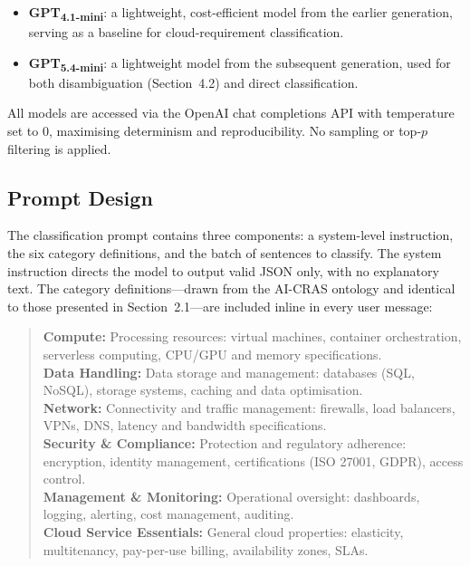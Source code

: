 \begin{itemize}
    \item \textbf{GPT\textsubscript{4.1-mini}}: a lightweight, cost-efficient model from the earlier generation, serving as a baseline for cloud-requirement classification.
    \item \textbf{GPT\textsubscript{5.4-mini}}: a lightweight model from the subsequent generation, used for both disambiguation (Section~4.2) and direct classification.
\end{itemize}

All models are accessed via the OpenAI chat completions API with temperature set to 0, maximising determinism and reproducibility. No sampling or top-$p$ filtering is applied.

\subsection{Prompt Design}

The classification prompt contains three components: a system-level instruction, the six category definitions, and the batch of sentences to classify. The system instruction directs the model to output valid JSON only, with no explanatory text. The category definitions—drawn from the AI-CRAS ontology and identical to those presented in Section~2.1—are included inline in every user message:

\begin{quote}
\small
\textbf{Compute:} Processing resources: virtual machines, container orchestration, serverless computing, CPU/GPU and memory specifications.\\
\textbf{Data Handling:} Data storage and management: databases (SQL, NoSQL), storage systems, caching and data optimisation.\\
\textbf{Network:} Connectivity and traffic management: firewalls, load balancers, VPNs, DNS, latency and bandwidth specifications.\\
\textbf{Security \& Compliance:} Protection and regulatory adherence: encryption, identity management, certifications (ISO 27001, GDPR), access control.\\
\textbf{Management \& Monitoring:} Operational oversight: dashboards, logging, alerting, cost management, auditing.\\
\textbf{Cloud Service Essentials:} General cloud properties: elasticity, multitenancy, pay-per-use billing, availability zones, SLAs.
\end{quote}

